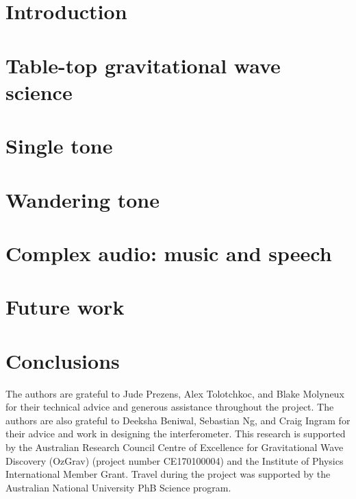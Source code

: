 \documentclass[prb,reprint]{revtex4-1}
\begin{document}
\maketitle

\section{Introduction}
\label{sec:introduction}



\section{Table-top gravitational wave science}
\label{sec:ifo}



\section{Single tone}
\label{sec:single_tone}


 
\section{Wandering tone}
\label{sec:viterbi_wandering}



\section{Complex audio: music and speech}
\label{sec:optical_microphone}



\section{Future work}
\label{sec:future_work}



\section{Conclusions}
\label{sec:conclusions}



\begin{acknowledgments}
The authors are grateful to Jude Prezens, Alex Tolotchkoc, and Blake Molyneux for their technical advice and generous assistance throughout the project.
The authors are also grateful to Deeksha Beniwal, Sebastian Ng, and Craig Ingram for their advice and work in designing the interferometer. 
This research is supported by the Australian Research Council Centre of Excellence for Gravitational Wave Discovery (OzGrav) (project number CE170100004) and the Institute of Physics International Member Grant.
Travel during the project was supported by the Australian National University PhB Science program.

\end{acknowledgments}






\newpage
\appendix

\end{document}
